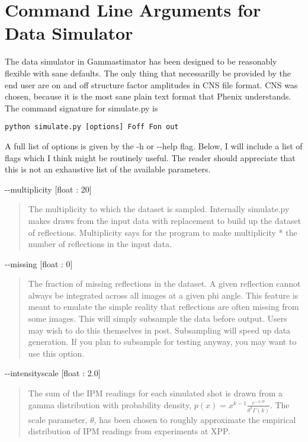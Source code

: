 \documentclass{report}
\begin{document}
\section{Command Line Arguments for Data Simulator}
The data simulator in Gammastimator has been designed to be reasonably flexible with sane defaults. 
The only thing that necessarilly be provided by the end user are on and off structure factor amplitudes in CNS file format.
CNS was chosen, because it is the most sane plain text format that Phenix understands. 
The command signature for simulate.py is

\begin{lstlisting}
python simulate.py [options] Foff Fon out
\end{lstlisting}

A full list of options is given by the -h or -{}-help flag. 
Below, I will include a list of flags which I think might be routinely useful. 
The reader should appreciate that this is not an exhaustive list of the available parameters. 
\bigskip


\noindent
-{}-multiplicity [float : 20] 
\begin{quote}
    The multiplicity to which the dataset is sampled. 
    Internally simulate.py makes draws from the input data with replacement to build up the dataset of reflections. 
    Multiplicity says for the program to make multiplicity * the number of reflections in the input data.
\end{quote}

\noindent
-{}-missing [float : 0] 
\begin{quote}
    The fraction of missing reflections in the dataset. 
    A given reflection cannot always be integrated across all images at a given phi angle.
    This feature is meant to emulate the simple reality that reflections are often missing from some images.
    This will simply subsample the data before output. 
    Users may wish to do this themselves in post.
    Subsampling will speed up data generation.
    If you plan to subsample for testing anyway, you may want to use this option.
\end{quote}

\noindent
-{}-intensityscale [float : 2.0]
\begin{quote}
    The sum of the IPM readings for each simulated shot is drawn from a gamma distribution with probability density, 
    $p(x) = x^{k - 1} \frac {e^{-x/\theta}} {\theta^k \Gamma(k)}$. 
    The scale parameter, $\theta$, has been chosen to roughly approximate the empirical distribution of IPM readings from experiments at XPP. 
\end{quote}
\end{document}

